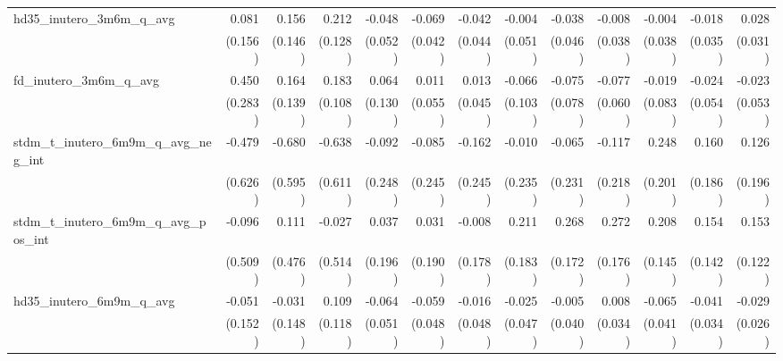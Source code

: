 \begin{tabular}{lrrrrrrrrrrrr}
hd35\_inutero\_3m6m\_q\_avg                 &        0.081 &        0.156 &        0.212 &       -0.048 &       -0.069 &       -0.042 &       -0.004 &       -0.038 &       -0.008 &       -0.004 &       -0.018 &        0.028 \\ 
                                            &      (0.156) &      (0.146) &      (0.128) &      (0.052) &      (0.042) &      (0.044) &      (0.051) &      (0.046) &      (0.038) &      (0.038) &      (0.035) &      (0.031) \\ 
fd\_inutero\_3m6m\_q\_avg                   &        0.450 &        0.164 &        0.183 &        0.064 &        0.011 &        0.013 &       -0.066 &       -0.075 &       -0.077 &       -0.019 &       -0.024 &       -0.023 \\ 
                                            &      (0.283) &      (0.139) &      (0.108) &      (0.130) &      (0.055) &      (0.045) &      (0.103) &      (0.078) &      (0.060) &      (0.083) &      (0.054) &      (0.053) \\ 
stdm\_t\_inutero\_6m9m\_q\_avg\_neg\_int    &       -0.479 &       -0.680 &       -0.638 &       -0.092 &       -0.085 &       -0.162 &       -0.010 &       -0.065 &       -0.117 &        0.248 &        0.160 &        0.126 \\ 
                                            &      (0.626) &      (0.595) &      (0.611) &      (0.248) &      (0.245) &      (0.245) &      (0.235) &      (0.231) &      (0.218) &      (0.201) &      (0.186) &      (0.196) \\ 
stdm\_t\_inutero\_6m9m\_q\_avg\_pos\_int    &       -0.096 &        0.111 &       -0.027 &        0.037 &        0.031 &       -0.008 &        0.211 &        0.268 &        0.272 &        0.208 &        0.154 &        0.153 \\ 
                                            &      (0.509) &      (0.476) &      (0.514) &      (0.196) &      (0.190) &      (0.178) &      (0.183) &      (0.172) &      (0.176) &      (0.145) &      (0.142) &      (0.122) \\ 
hd35\_inutero\_6m9m\_q\_avg                 &       -0.051 &       -0.031 &        0.109 &       -0.064 &       -0.059 &       -0.016 &       -0.025 &       -0.005 &        0.008 &       -0.065 &       -0.041 &       -0.029 \\ 
                                            &      (0.152) &      (0.148) &      (0.118) &      (0.051) &      (0.048) &      (0.048) &      (0.047) &      (0.040) &      (0.034) &      (0.041) &      (0.034) &      (0.026) \\ 

\end{tabular}
